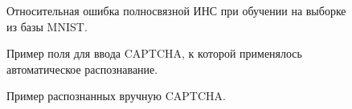 \documentclass[a4paper,12pt,russian]{article} %
\begin{document}
\begin{figure}[t!]
	\caption{
		Относительная ошибка полносвязной ИНС при обучении на выборке из базы MNIST.
        }
        \label{fig:nn_result_err}
\end{figure}

\begin{figure}[t!]
	\caption{
		Пример поля для ввода CAPTCHA, к которой применялось автоматическое распознавание.
        }
        \label{fig:cap_site_part}
\end{figure}

\begin{figure}[t!]
	\caption{
		Пример распознанных вручную CAPTCHA.
        }
        \label{fig:cap_site_recd}
\end{figure}
\end{document}
